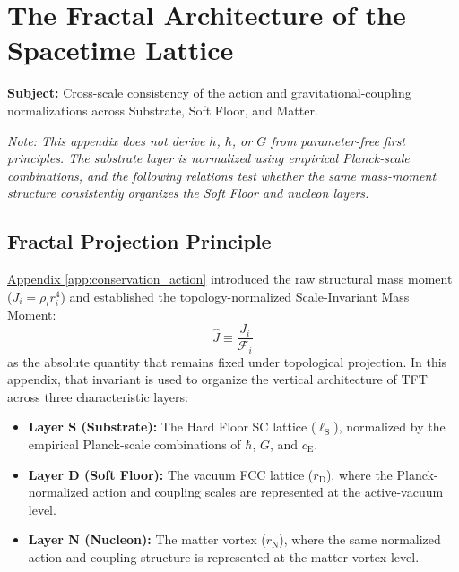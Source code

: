 \chapter{The Fractal Architecture of the Spacetime Lattice}
\label{app:fractal_architecture}

\noindent\textbf{Subject:} Cross-scale consistency of the action and gravitational-coupling normalizations across Substrate, Soft Floor, and Matter.

\vspace{0.5em}
\noindent\textit{Note: This appendix does not derive $h$, $\hbar$, or $G$ from parameter-free first principles. The substrate layer is normalized using empirical Planck-scale combinations, and the following relations test whether the same mass-moment structure consistently organizes the Soft Floor and nucleon layers.}

\section{Fractal Projection Principle}

\hyperref[app:conservation_action]{Appendix \ref*{app:conservation_action}} introduced the raw structural mass moment ($J_i = \rho_i r_i^4$) and established the topology-normalized Scale-Invariant Mass Moment:
\begin{equation}
    \hat{J} \equiv \frac{J_i}{\mathcal{F}_i}
\end{equation}
as the absolute quantity that remains fixed under topological projection. In this appendix, that invariant is used to organize the vertical architecture of TFT across three characteristic layers:

\begin{itemize}
    \item \textbf{Layer S (Substrate):} The Hard Floor SC lattice ($\ell_{\mathrm{S}}$), normalized by the empirical Planck-scale combinations of $\hbar$, $G$, and $c_{\mathrm{E}}$.
    \item \textbf{Layer D (Soft Floor):} The vacuum FCC lattice ($r_{\mathrm{D}}$), where the Planck-normalized action and coupling scales are represented at the active-vacuum level.
    \item \textbf{Layer N (Nucleon):} The matter vortex ($r_{\mathrm{N}}$), where the same normalized action and coupling structure is represented at the matter-vortex level.
\end{itemize}

